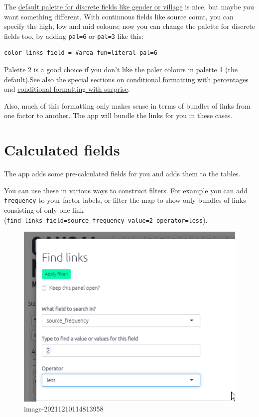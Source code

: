 \documentclass[
]{book}
\begin{document}
The \href{https://colorbrewer2.org/\#type=qualitative\&scheme=Set1\&n=9}{default palette for discrete fields like gender or village} is nice, but maybe you want something different. With continuous fields like source count, you can specify the high, low and mid colours; now you can change the palette for discrete fields too, by adding \texttt{pal=6} or \texttt{pal=3} like this:

\begin{verbatim}
color links field = #area fun=literal pal=6
\end{verbatim}

Palette 2 is a good choice if you don't like the paler colours in palette 1 (the default).See also the special sections on \protect\hyperlink{percent}{conditional formatting with percentages} and \protect\hyperlink{xsurprise}{conditional formatting with surprise}.

Also, much of this formatting only makes sense in terms of bundles of links from one factor to another. The app will bundle the links for you in these cases.

\hypertarget{xcalculated-fields}{%
\section{Calculated fields}\label{xcalculated-fields}}

The app adds some pre-calculated fields for you and adds them to the tables.

You can use these in various ways to construct filters. For example you can add \texttt{frequency} to your factor labels, or filter the map to show only bundles of links consisting of only one link (\texttt{find\ links\ field=source\_frequency\ value=2\ operator=less}).

\begin{figure}
\centering
\includegraphics[width=6.77083in,height=\textheight]{_assets/image-20211210114813958.png}
\caption{image-20211210114813958}
\end{figure}
\end{document}
